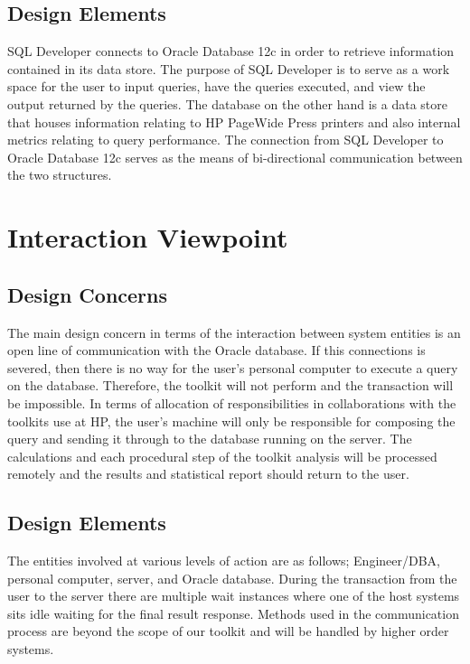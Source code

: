 \documentclass[draftclsnofoot, onecolumn, compsoc, 10pt]{IEEEtran}
\begin{document}
\subsection{Design Elements}
SQL Developer connects to Oracle Database 12c in order to retrieve information contained in its data store.
The purpose of SQL Developer is to serve as a work space for the user to input queries, have the queries executed, and view the output returned by the queries.
The database on the other hand is a data store that houses information relating to HP PageWide Press printers and also internal metrics relating to query performance.
The connection from SQL Developer to Oracle Database 12c serves as the means of bi-directional communication between the two structures.


\section{Interaction Viewpoint}

\subsection{Design Concerns}
The main design concern in terms of the interaction between system entities is an open line of communication with the Oracle database.
If this connections is severed, then there is no way for the user's personal computer to execute a query on the database.
Therefore, the toolkit will not perform and the transaction will be impossible. 
In terms of allocation of responsibilities in collaborations with the toolkits use at HP, the user's machine will only be responsible for composing the query and sending it through to the database running on the server.
The calculations and each procedural step of the toolkit analysis will be processed remotely and the results and statistical report should return to the user.

\subsection{Design Elements}
The entities involved at various levels of action are as follows; Engineer/DBA, personal computer, server, and Oracle database.
During the transaction from the user to the server there are multiple wait instances where one of the host systems sits idle waiting for the final result response.
Methods used in the communication process are beyond the scope of our toolkit and will be handled by higher order systems.
\end{document}
